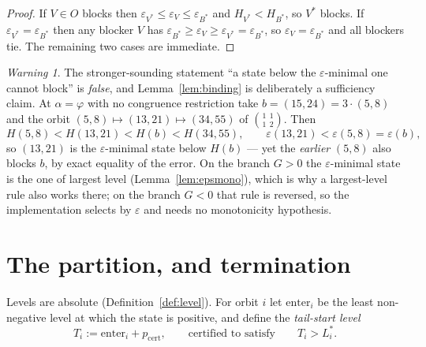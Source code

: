 \documentclass[11pt]{article}
\theoremstyle{definition}
\theoremstyle{remark}
\newtheorem{warning}[theorem]{Warning}
\begin{document}
\begin{proof}
If $V\in O$ blocks then $\varepsilon_{V^{*}}\le\varepsilon_V\le\varepsilon_{B^{*}}$ and
$H_{V^{*}}<H_{B^{*}}$, so $V^{*}$ blocks. If $\varepsilon_{V^{*}}=\varepsilon_{B^{*}}$ then any
blocker $V$ has $\varepsilon_{B^{*}}\ge\varepsilon_V\ge\varepsilon_{V^{*}}=\varepsilon_{B^{*}}$,
so $\varepsilon_V=\varepsilon_{B^{*}}$ and all blockers tie. The remaining two cases are
immediate.
\end{proof}

\begin{warning}\label{warn:binding}
The stronger-sounding statement ``a state below the $\varepsilon$-minimal one cannot block'' is
\emph{false}, and Lemma~\ref{lem:binding} is deliberately a sufficiency claim. At
$\alpha=\varphi$ with no congruence restriction take $b=(15,24)=3\cdot(5,8)$ and the orbit
$(5,8)\mapsto(13,21)\mapsto(34,55)$ of $\binom{1\ \ 1}{1\ \ 2}$. Then
\[
H(5,8)<H(13,21)<H(b)<H(34,55),\qquad
\varepsilon(13,21)<\varepsilon(5,8)=\varepsilon(b),
\]
so $(13,21)$ is the $\varepsilon$-minimal state below $H(b)$ --- yet the \emph{earlier} $(5,8)$
also blocks $b$, by exact equality of the error. On the branch $G>0$ the
$\varepsilon$-minimal state is the one of largest level (Lemma~\ref{lem:epsmono}), which is why
a largest-level rule also works there; on the branch $G<0$ that rule is reversed, so the
implementation selects by $\varepsilon$ and needs no monotonicity hypothesis.
\end{warning}

\section{The partition, and termination}\label{sec:partition}

Levels are absolute (Definition~\ref{def:level}). For orbit $i$ let $\mathrm{enter}_i$ be the
least non-negative level at which the state is positive, and define the \emph{tail-start level}
\[
T_i:=\mathrm{enter}_i+p_{\mathrm{cert}},\qquad\text{certified to satisfy}\qquad T_i>L_i^{*}.
\]
\end{document}
